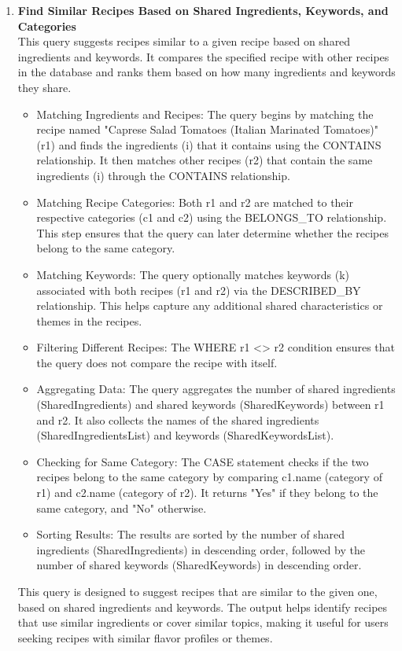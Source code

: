 \begin{enumerate}
    \clearpage
    \item \textbf{Find Similar Recipes Based on Shared Ingredients, Keywords, and Categories}\\
    This query suggests recipes similar to a given recipe based on shared ingredients and keywords. It compares the specified recipe with other recipes in the database and ranks them based on how many ingredients and keywords they share. 
    \begin{itemize}
        \item Matching Ingredients and Recipes:
The query begins by matching the recipe named "Caprese Salad Tomatoes (Italian Marinated Tomatoes)" (r1) and finds the ingredients (i) that it contains using the CONTAINS relationship. It then matches other recipes (r2) that contain the same ingredients (i) through the CONTAINS relationship.
        \item Matching Recipe Categories:
Both r1 and r2 are matched to their respective categories (c1 and c2) using the BELONGS\_TO relationship. This step ensures that the query can later determine whether the recipes belong to the same category.
        \item Matching Keywords:
The query optionally matches keywords (k) associated with both recipes (r1 and r2) via the DESCRIBED\_BY relationship. This helps capture any additional shared characteristics or themes in the recipes.
        \item Filtering Different Recipes:
The WHERE r1 <> r2 condition ensures that the query does not compare the recipe with itself.
        \item Aggregating Data:
The query aggregates the number of shared ingredients (SharedIngredients) and shared keywords (SharedKeywords) between r1 and r2. It also collects the names of the shared ingredients (SharedIngredientsList) and keywords (SharedKeywordsList).
        \item Checking for Same Category:
The CASE statement checks if the two recipes belong to the same category by comparing c1.name (category of r1) and c2.name (category of r2). It returns "Yes" if they belong to the same category, and "No" otherwise.
        \item Sorting Results:
The results are sorted by the number of shared ingredients (SharedIngredients) in descending order, followed by the number of shared keywords (SharedKeywords) in descending order.
    \end{itemize}

This query is designed to suggest recipes that are similar to the given one, based on shared ingredients and keywords. The output helps identify recipes that use similar ingredients or cover similar topics, making it useful for users seeking recipes with similar flavor profiles or themes.

\end{enumerate}
